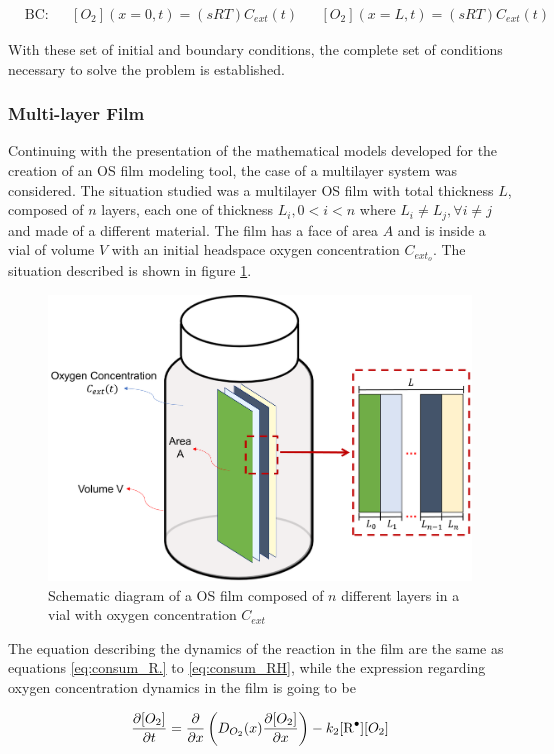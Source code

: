 \begin{refsection}
\begin{align}
    &\text{BC:} & &[O_2](x=0, t)= \left(sRT\right) C_{ext}(t) & & [O_2](x=L, t)= \left(sRT\right) C_{ext}(t)
    \label{eq:bc_mono_film}
\end{align}

With these set of initial and boundary conditions, the complete set of conditions necessary to solve the problem is established.

\subsubsection{Multi-layer Film}
Continuing with the presentation of the mathematical models developed for the creation of an OS film modeling tool, the case of a multilayer system was considered. The situation studied was a multilayer OS film with total thickness $L$,  composed of  $n$ layers, each one of thickness $L_i, 0<i<n$ where  $L_i\neq L_j, \forall  i\neq j$ and made of a different material. The film has a face of area $A$ and is inside a vial of volume $V$ with an initial headspace oxygen concentration $C_{ext_o}$. The situation described is shown in figure \ref{fig:model_multilayer_diagram}.

\begin{figure}[ht]
    \centering
    \includegraphics[width=0.62\linewidth]{Documento_Latex/Tesis_1/Imagenes/modelo_multicapa.png}
    \caption{Schematic diagram of a OS film composed of $n$ different layers in a vial with oxygen concentration $C_{ext}$}
    \label{fig:model_multilayer_diagram}
\end{figure}

The equation describing the dynamics of the reaction in the film are the same as equations \ref{eq:consum_R.} to \ref{eq:consum_RH}, while the expression regarding oxygen concentration dynamics in the film is going to be

\begin{equation}
    \frac{\partial [O_2]}{\partial t}= \frac{\partial}{\partial x} \left(D_{O_2}(x) \frac{\partial [O_2] }{\partial x}\right) -k_2[\ce{R^.}][O_2]
    \label{eq:mass_bal_def_multi}
\end{equation}


\end{refsection}
